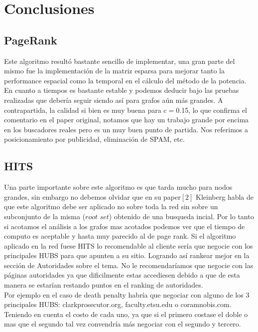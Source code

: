 
\section{Conclusiones}

\subsection{PageRank}
Este algoritmo resultó bastante sencillo de implementar, una gran parte del mismo fue la implementación de la matriz esparsa para mejorar tanto la performance espacial como la temporal en el cálculo del método de la potencia. \\
En cuanto a tiempos es bastante estable y podemos deducir bajo las pruebas realizadas que debería seguir siendo así para grafos aún más grandes. A contrapartida, la calidad si bien es muy buena para c$=$0.15, lo que confirma el comentario en el paper original, notamos que hay un trabajo grande por encima en los buscadores reales pero es un muy buen punto de partida. Nos referimos a posicionamiento por publicidad, eliminación de SPAM, etc.

\subsection{HITS}

Una parte importante sobre este algoritmo es que tarda mucho para nodos grandes, sin embargo no debemos olvidar que en su paper$[2]$ Kleinberg habla de que este algoritmo debe ser aplicado no sobre toda la red sin sobre un subconjunto de la misma ($\textit{root set}$) obtenido de una busqueda incial. Por lo tanto si acotamos el análisis a los grafos mas acotados podemos ver que el tiempo de computo es aceptable y hasta muy parecido al de page rank. 
Si el algoritmo aplicado en la red fuese HITS lo recomendable al cliente sería que negocie con los principales HUBS para que apunten a su sitio. Logrando así rankear mejor en la sección de Autoridades sobre el tema. 
No le recomendaríamos que negocie con las páginas autoridades ya que dificilmente estas accediesen debido a que de esta manera se estarían restando puntos en el ranking de autoridades.\\
Por ejemplo en el caso de death penalty habría que negociar con alguno de los 3 principales HUBS: clarkprosecutor.org, faculty.etsu.edu o coramnobis.com. Teniendo en cuenta el costo de cada uno, ya que si el primero costase el doble 
o mas que el segundo tal vez convendría más negociar con el segundo y tercero.

